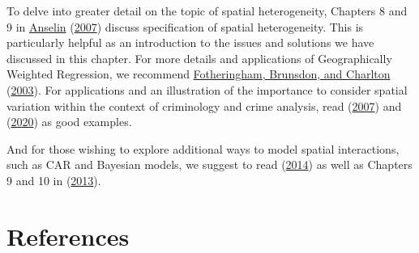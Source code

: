 \documentclass[
  krantz2]{krantz}
\begin{document}
To delve into greater detail on the topic of spatial heterogeneity, Chapters 8 and 9 in \protect\hyperlink{ref-Anselin_2007}{Anselin} (\protect\hyperlink{ref-Anselin_2007}{2007}) discuss specification of spatial heterogeneity. This is particularly helpful as an introduction to the issues and solutions we have discussed in this chapter. For more details and applications of Geographically Weighted Regression, we recommend \protect\hyperlink{ref-Fotheringham_2003}{Fotheringham, Brunsdon, and Charlton} (\protect\hyperlink{ref-Fotheringham_2003}{2003}). For applications and an illustration of the importance to consider spatial variation within the context of criminology and crime analysis, read (\protect\hyperlink{ref-Cahill_2007}{2007}) and (\protect\hyperlink{ref-Andresen_2020b}{2020}) as good examples.

And for those wishing to explore additional ways to model spatial interactions, such as CAR and Bayesian models, we suggest to read (\protect\hyperlink{ref-Banerjee_2014}{2014}) as well as Chapters 9 and 10 in (\protect\hyperlink{ref-Bivand_2013}{2013}).

\hypertarget{references}{%
\chapter*{References}\label{references}}
\end{document}
